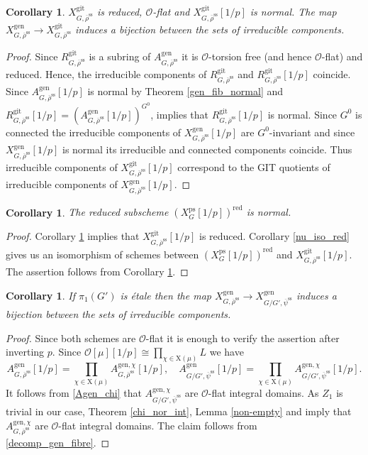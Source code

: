 \documentclass{amsart}
\newtheorem{cor}[prop]{Corollary}
\theoremstyle{definition}
\theoremstyle{remark}
\newcommand{\OO}{\mathcal O}
\newcommand{\rhobar}{\overline{\rho}}
\newcommand{\ps}{\mathrm{ps}}
\newcommand{\gen}{\mathrm{gen}}
\newcommand{\gps}{\mathrm{git}}
\newcommand{\red}{\mathrm{red}}
\newcommand{\rhobarss}{\rhobar^{\mathrm{ss}}}
\newcommand{\psibar}{\overline{\psi}}
\newcommand{\git}{\mathrm{git}}
\newcommand{\psibarss}{\psibar^{\mathrm {ss}}}
\begin{document}
\begin{cor}\label{gps_normal} $X^{\gps}_{G, \rhobarss}$ is reduced, $\OO$-flat and $X^{\gps}_{G, \rhobarss}[1/p]$ is normal. The map $X^{\gen}_{G, \rhobarss}\rightarrow X^{\gps}_{G, \rhobarss}$
induces a bijection between  the sets of irreducible components. 
\end{cor}
\begin{proof} Since $R^{\gps}_{G, \rhobarss}$ is a subring of $A^{\gen}_{G, \rhobarss}$ it is $\OO$-torsion free (and hence
$\OO$-flat) and reduced. Hence, the irreducible components of $R^{\gps}_{G, \rhobarss}$ and $R^{\gps}_{G, \rhobarss}[1/p]$ coincide.  Since $A^{\gen}_{G, \rhobarss}[1/p]$ is 
normal by Theorem \ref{gen_fib_normal} and $R^{\gps}_{G, \rhobarss}[1/p]=(A^{\gen}_{G, \rhobarss}[1/p])^{G^0}$, \cite[Proposition 6.4.1]{BH} implies that $R^{\gps}_{G, \rhobarss}[1/p]$ is normal. 
Since $G^0$ is connected the irreducible components of $X^{\gen}_{G, \rhobarss}[1/p]$ are 
$G^0$-invariant and since $X^{\gen}_{G, \rhobarss}[1/p]$ is normal its irreducible 
and connected components coincide. Thus irreducible components of $X^{\git}_{G, \rhobarss}[1/p]$ correspond to 
the GIT quotients of irreducible components of  $X^{\gen}_{G, \rhobarss}[1/p]$.
\end{proof}

\begin{cor}\label{ps_normal} The reduced subscheme $(X^{\ps}_G[1/p])^{\red}$ is normal. 
\end{cor} 
\begin{proof} Corollary \ref{gps_normal} implies that $X^{\gps}_{G, \rhobarss}[1/p]$ is reduced. Corollary \ref{nu_iso_red} gives us an isomorphism 
of schemes between $(X^{\ps}_G[1/p])^{\red}$ and $X^{\gps}_{G, \rhobarss}[1/p]$. The assertion follows from Corollary \ref{gps_normal}.
\end{proof} 


\begin{cor}\label{bij_comp_Xgen} If $\pi_1(G')$ is \'etale then the map $X^{\gen}_{G, \rhobarss}\rightarrow X^{\gen}_{G/G', \psibarss}$ induces a bijection between the sets of irreducible components. 
\end{cor}
\begin{proof} Since both schemes are $\OO$-flat it is enough to verify the assertion after inverting $p$. Since $\OO[\mu][1/p]\cong \prod_{\chi\in \mathrm X(\mu)} L$ we have 
\begin{equation}\label{decomp_gen_fibre}
A^{\gen}_{G, \rhobarss}[1/p] = \prod_{\chi\in \mathrm X(\mu)} A^{\gen, \chi}_{G, \rhobarss}[1/p], \quad A^{\gen}_{G/G', \psibarss}[1/p] = \prod_{\chi\in \mathrm X(\mu)} A^{\gen, \chi}_{G/G', \psibarss}[1/p].
\end{equation}
It follows from \eqref{Agen_chi} that $A^{\gen,\chi}_{G/G', \psibarss}$ are $\OO$-flat integral domains. 
As $Z_1$ is trivial in our case, Theorem \ref{chi_nor_int},  Lemma \ref{non-empty} and  
imply that  $A^{\gen, \chi}_{G, \rhobarss}$ are $\OO$-flat integral domains. The claim follows from \eqref{decomp_gen_fibre}.
\end{proof}
\end{document}
